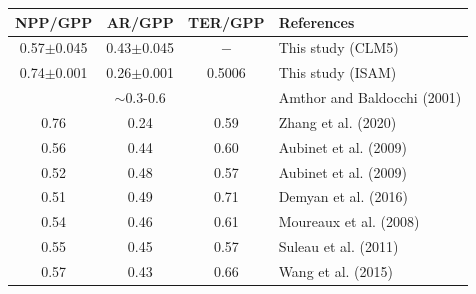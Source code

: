 \documentclass[11pt]{article}
\begin{document}
\begin{table}
    \label{tab:Tab63_carbonfluxes_models}
    \small %
    \begin{tabularx}{0.485\textwidth}{@{}c c c l@{}}
        \toprule
        \textbf{NPP/GPP} & \textbf{AR/GPP} & \textbf{TER/GPP} & \textbf{References} \\ 
        \midrule
        0.57$\pm$0.045 & 0.43$\pm$0.045 & $-$ & This study (CLM5) \\ [0.5ex]
        0.74$\pm$0.001 & 0.26$\pm$0.001 & 0.5006 & This study (ISAM) \\ [0.5ex]
            &   $\sim$0.3-0.6 &     &   Amthor and Baldocchi (2001) \\ [0.5ex] 
        0.76 & 0.24 & 0.59 & Zhang et al. (2020) \\ [0.5ex]
        0.56 & 0.44 & 0.60 & Aubinet et al. (2009) \\ [0.5ex] 
        0.52 & 0.48 & 0.57 & Aubinet et al. (2009) \\ [0.5ex]
        0.51 & 0.49 & 0.71 & Demyan et al. (2016) \\ [0.5ex]
        0.54 & 0.46 & 0.61 & Moureaux et al. (2008) \\ [0.5ex]
        0.55 & 0.45 & 0.57 & Suleau et al. (2011) \\ [0.5ex]
        0.57 & 0.43 & 0.66 & Wang et al. (2015) \\ [0.5ex]
        \bottomrule
    \end{tabularx}
\end{table}
\end{document}
